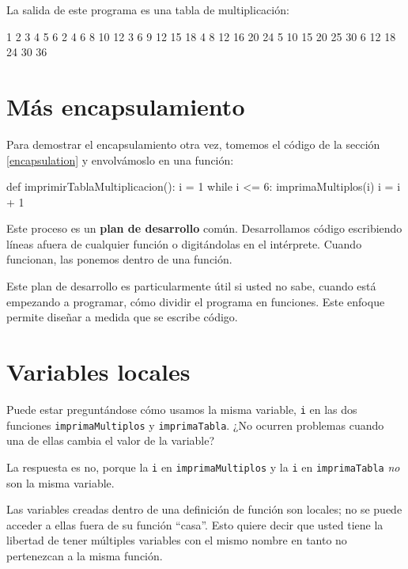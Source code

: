 La salida de este programa es una tabla de multiplicación:
\begin{pythoncode}
1      2      3      4      5      6
2      4      6      8      10     12
3      6      9      12     15     18
4      8      12     16     20     24
5      10     15     20     25     30
6      12     18     24     30     36
\end{pythoncode}

\section{Más encapsulamiento}

Para demostrar el encapsulamiento otra vez, tomemos el código de la
sección \ref{encapsulation} y envolvámoslo en una función:
\begin{pythoncode}
def imprimirTablaMultiplicacion():
  i = 1
  while i <= 6:
    imprimaMultiplos(i)
    i = i + 1
\end{pythoncode}

Este proceso es un \textbf{plan de desarrollo} común. Desarrollamos
código escribiendo líneas afuera de cualquier función o digitándolas
en el intérprete. Cuando funcionan, las ponemos dentro de una función.

Este plan de desarrollo es particularmente útil si usted no sabe,
cuando está empezando a programar, cómo dividir el programa en funciones.
Este enfoque permite diseñar a medida que se escribe código.

\section{Variables locales}

 

Puede estar preguntándose cómo usamos la misma variable, \texttt{i}
en las dos funciones \texttt{imprimaMultiplos} y \texttt{imprimaTabla}.
¿No ocurren problemas cuando una de ellas cambia el valor de la variable?

La respuesta es no, porque la \texttt{i} en \texttt{imprimaMultiplos}
y la \texttt{i} en \texttt{imprimaTabla} {\em no} son la misma
variable.

Las variables creadas dentro de una definición de función son locales;
no se puede acceder a ellas fuera de su función ``casa''. Esto quiere
decir que usted tiene la libertad de tener múltiples variables con
el mismo nombre en tanto no pertenezcan a la misma función.

